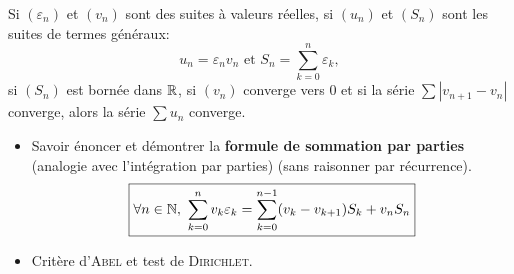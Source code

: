 \begin{tcolorbox}
    Si $(\varepsilon_n)$ et $(v_n)$ sont des suites à valeurs réelles, si $(u_n)$ et $(S_n)$ sont les suites de termes généraux:
    $$u_n = \varepsilon_n v_n \text{ et } S_n = \sum_{k=0}^{n} \varepsilon_k,$$
    si $(S_n)$ est bornée dans $\mathbb{R}$, si $(v_n)$ converge vers $0$ et si la série $\sum |v_{n+1} - v_n|$ converge, alors la série $\sum u_n$ converge.
\end{tcolorbox}

\begin{itemize}
    \item Savoir énoncer et démontrer la \textbf{formule de sommation par parties} (analogie avec l'intégration par parties) (sans raisonner par récurrence).
    $$\boxed{\forall n \in \mathbb{N},\ \sum_{k=0}^{n} v_k \varepsilon_k = \sum_{k=0}^{n-1} (v_k -v_{k+1})S_k + v_nS_n}$$
    \item Critère d'\textsc{Abel} et test de \textsc{Dirichlet}.
\end{itemize}